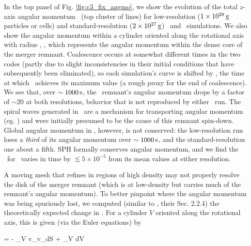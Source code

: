 In the top panel of Fig. \ref{fig:c3_fix_angmo}, we show the evolution of the total $z$-axis angular momentum \Lztot\ (top cluster of lines) for low-resolution ($1\times10^{28}\,\mathrm{g}$ particles or cells) and standard-resolution ($2\times10^{27}\,\mathrm{g}$) \gasoline\ and \arepo\ simulations.  We also show the angular momentum within a cylinder oriented along the rotational axis with radius \innercyl, \Lzinner, which represents the angular momentum within the dense core of the merger remnant.  Coalescence occurs at somewhat different times in the two codes (partly due to slight inconsistencies in their initial conditions that have subsequently been eliminated), so each simulation's curve is shifted by \tlm, the time at which \Lzinner\ achieves its maximum value (a rough proxy for the end of coalescence).  We see that, over $\sim1000\,\mathrm{s}$, the \arepo\ remnant's angular momentum drops by a factor of $\sim20$ at both resolutions, behavior that is not reproduced by either \gasoline\ run.  The spiral waves generated in \arepo\ are a mechanism for transporting angular momentum (eg. \citealt{balb03}) and were initially presumed to be the cause of this remnant spin-down.  Global angular momentum in \arepo, however, is not conserved: the low-resolution run loses a \textit{third} of its angular momentum over $\sim1000\,\mathrm{s}$, and the standard-resolution one about a fifth.  SPH formally conserves angular momentum, and we find the \Lztot\ for \gasoline\ varies in time by $\lesssim5\times10^{-5}$ from its mean values at either resolution.


A moving mesh that refines in regions of high density may not properly resolve the disk of the merger remnant (which is at low-density but carries much of the remnant's angular momentum).  To better pinpoint where the angular momentum was being spuriously lost, we computed (similar to \citealt{ji+13}, their Sec. 2.2.4) the theoretically expected change in \Lz.  For a cylinder $V$ oriented along the rotational axis, this is given (via the Euler equations) by

\eqbegin
{} = - \oint_V \rho \varpi v_\phi v_\varpi dS + \int_V {\boldmath \varpi}\times{\bf \nabla}\Phi dV
\label{eq:c3_angmobalance}
\eqend

